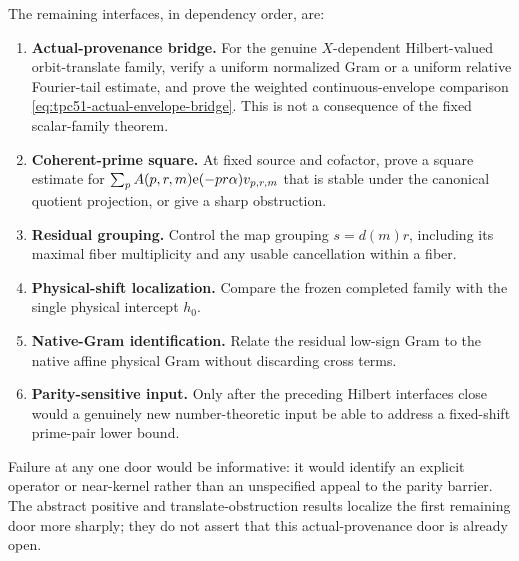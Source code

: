 The remaining interfaces, in dependency order, are:
\begin{enumerate}[label=\textup{D\arabic*:},leftmargin=3.4em]
 \item \textbf{Actual-provenance bridge.}  For the genuine
 \(X\)-dependent Hilbert-valued orbit-translate family, verify a uniform
 normalized Gram or a uniform relative Fourier-tail estimate, and prove
 the weighted continuous-envelope comparison
 \eqref{eq:tpc51-actual-envelope-bridge}.  This is not a consequence of
 the fixed scalar-family theorem.
 \item \textbf{Coherent-prime square.}  At fixed source and cofactor,
 prove a square estimate for
 \(\sum_p A(p,r,m)\mathrm e(-pr\alpha)v_{p,r,m}\) that is stable under the
 canonical quotient projection, or give a sharp obstruction.
 \item \textbf{Residual grouping.}  Control the map grouping
 \(s=d(m)r\), including its maximal fiber multiplicity and any usable
 cancellation within a fiber.
 \item \textbf{Physical-shift localization.}  Compare the frozen
 completed family with the single physical intercept \(h_0\).
 \item \textbf{Native-Gram identification.}  Relate the residual
 low-sign Gram to the native affine physical Gram without discarding
 cross terms.
 \item \textbf{Parity-sensitive input.}  Only after the preceding
 Hilbert interfaces close would a genuinely new number-theoretic input
 be able to address a fixed-shift prime-pair lower bound.
\end{enumerate}

Failure at any one door would be informative: it would identify an
explicit operator or near-kernel rather than an unspecified appeal to
the parity barrier.  The abstract positive and translate-obstruction
results localize the first remaining door more sharply; they do not
assert that this actual-provenance door is already open.
